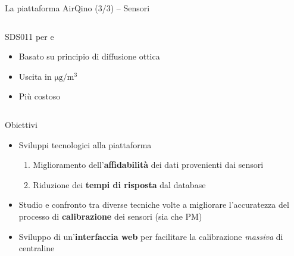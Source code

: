 \begin{frame}[t]{La piattaforma AirQino (3/3) – Sensori}
\begin{columns}
\begin{column}{0.5\textwidth}
\begin{center}
\begin{block}{SDS011 per  e }
\begin{figure}[H]
    \centering
\end{figure}
\vspace{0.1cm}
\begin{itemize}
  \item Basato su principio di diffusione ottica
  \item Uscita in $\mathrm{\si{\micro}g/m^3}$
  \item Più costoso
\end{itemize}
\vspace{0.1cm}

\end{block}
\end{center}
\end{column}

\end{columns}
\end{frame}

\begin{frame}{Obiettivi}
\begin{itemize}
  \item Sviluppi tecnologici alla piattaforma
  \begin{enumerate}
    \item Miglioramento dell'\textbf{affidabilità} dei dati provenienti dai sensori
    \item Riduzione dei \textbf{tempi di risposta} dal database
  \end{enumerate}\vspace{0.3cm}
  \item Studio e confronto tra diverse tecniche volte a migliorare l’accuratezza del processo di \textbf{calibrazione} dei sensori (sia  che PM)\vspace{0.3cm}
  \item Sviluppo di un’\textbf{interfaccia web} per facilitare la calibrazione \textit{massiva} di centraline
\end{itemize}
\end{frame}



